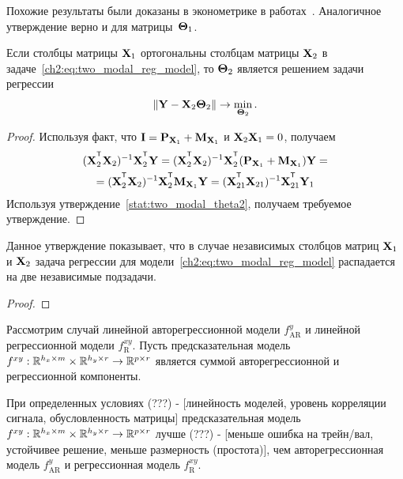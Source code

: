 Похожие результаты были доказаны в эконометрике в работах~\cite{frisch1933partial,lovell1963seasonal,cinelli2020making}. Аналогичное утверждение верно и для матрицы~$\boldsymbol{\Theta}_1$. 

\begin{statement}
	Если столбцы матрицы $\mathbf{X}_1$ ортогональны столбцам матрицы $\mathbf{X}_2$ в задаче~\eqref{ch2:eq:two_modal_reg_model}, то $\boldsymbol{\Theta}_2$ является решением задачи регрессии
	\[
			\| \mathbf{Y} -  \mathbf{X}_{2} \boldsymbol{\Theta}_2 \| \rightarrow \min_{\boldsymbol{\Theta}_2}.
	\]
\end{statement}

\begin{proof}
	Используя факт, что $\mathbf{I} = \mathbf{P}_{\mathbf{X}_1} + \mathbf{M}_{\mathbf{X}_1}$ и $\mathbf{X}_2 \mathbf{X}_1 = 0$, получаем
	\begin{multline*}
		(\bX_2^{\T} \bX_2)^{-1} \bX_2^{\T} \bY = (\bX_2^{\T} \bX_2)^{-1} \bX_2^{\T} (\bP_{\bX_1} + \bM_{\bX_1}) \bY = \\ = (\bX_2^{\T} \bX_2)^{-1} \bX_2^{\T} \bM_{\bX_1} \bY  = (\bX_{21}^{\T} \bX_{21})^{-1} \bX_{21}^{\T} \bY_1
	\end{multline*}
	Используя утверждение~\autoref{stat:two_modal_theta2}, получаем требуемое утверждение.
\end{proof}
Данное утверждение показывает, что в случае независимых столбцов матриц $\mathbf{X}_1$ и $\mathbf{X}_2$ задача регрессии для модели~\eqref{ch2:eq:two_modal_reg_model} распадается на две независимые подзадачи.

\begin{statement}
	
\end{statement}

\begin{proof}

\end{proof}

Рассмотрим случай линейной авторегрессионной модели $f_{\text{AR}}^y$ и линейной регрессионной модели $f_{\text{R}}^{xy}$. Пусть предсказательная модель $f^{xy}: \mathbb{R}^{h_x \times m} \times \mathbb{R}^{h_y \times r} \rightarrow \mathbb{R}^{p \times r}$ является суммой авторегрессионной и регрессионной компоненты.

\begin{theorem}
	При определенных условиях (???) - [линейность моделей, уровень корреляции сигнала, обусловленность матрицы] предсказательная модель $f^{xy}: \mathbb{R}^{h_x \times m} \times \mathbb{R}^{h_y \times r} \rightarrow \mathbb{R}^{p \times r}$ лучше (???) - [меньше ошибка на трейн/вал, устойчивее решение, меньше размерность (простота)], чем авторегрессионная модель $f_{\text{AR}}^y$ и регрессионная модель $f_{\text{R}}^{xy}$.
\end{theorem}

